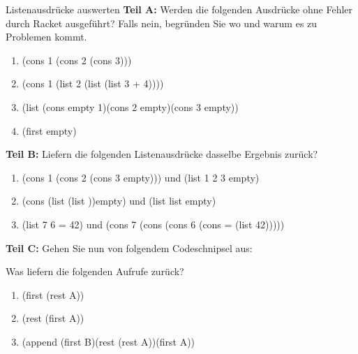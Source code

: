 \documentclass{../preamble}
\begin{document}
	\begin{task}[credit = \stars{1}{3}]{Listenausdrücke auswerten}
	    {\large\textbf{Teil A:}} Werden die folgenden Ausdrücke ohne Fehler durch Racket ausgeführt? Falls nein, begründen Sie wo und warum es zu Problemen kommt.
	    \begin{enumerate}
	        \item (\textcolor{keywordcolor}{cons} 1 (\textcolor{keywordcolor}{cons} 2 (\textcolor{keywordcolor}{cons} 3)))
	        \item (\textcolor{keywordcolor}{cons} 1 (\textcolor{keywordcolor}{list} 2 (\textcolor{keywordcolor}{list} (\textcolor{keywordcolor}{list} 3 + 4))))
	        \item (\textcolor{keywordcolor}{list} (\textcolor{keywordcolor}{cons} \textcolor{keywordcolor}{empty} 1)(\textcolor{keywordcolor}{cons} 2 \textcolor{keywordcolor}{empty})(\textcolor{keywordcolor}{cons} 3 \textcolor{keywordcolor}{empty}))
	        \item (\textcolor{keywordcolor}{first} \textcolor{keywordcolor}{empty})
	    \end{enumerate}
	    {\large\textbf{Teil B:}} Liefern die folgenden Listenausdrücke dasselbe Ergebnis zurück?
	    \begin{enumerate}
	        \item (\textcolor{keywordcolor}{cons} 1 (\textcolor{keywordcolor}{cons} 2 (\textcolor{keywordcolor}{cons} 3 \textcolor{keywordcolor}{empty}))) und (\textcolor{keywordcolor}{list} 1 2 3 \textcolor{keywordcolor}{empty})
	        \item (\textcolor{keywordcolor}{cons} (\textcolor{keywordcolor}{list} \grqq(\textcolor{keywordcolor}{list} )\grqq)\textcolor{keywordcolor}{empty}) und (\textcolor{keywordcolor}{list} \grqq\textcolor{keywordcolor}{list}\grqq{} \textcolor{keywordcolor}{empty})
	        \item (\textcolor{keywordcolor}{list} 7 \grqq *\grqq{} 6 \grqq =\grqq{} 42) und (\textcolor{keywordcolor}{cons} 7 (\textcolor{keywordcolor}{cons} \grqq *\grqq{} (\textcolor{keywordcolor}{cons} 6 (\textcolor{keywordcolor}{cons} \grqq =\grqq{} (\textcolor{keywordcolor}{list} 42)))))
	    \end{enumerate}
	    {\large\textbf{Teil C:}} Gehen Sie nun von folgendem Codeschnipsel aus:
	    
	    Was liefern die folgenden Aufrufe zurück?
	    \begin{enumerate}
	        \item (\textcolor{keywordcolor}{first} (\textcolor{keywordcolor}{rest} A))
	        \item (\textcolor{keywordcolor}{rest} (\textcolor{keywordcolor}{first} A))
	        \item (\textcolor{keywordcolor}{append} (\textcolor{keywordcolor}{first} B)(\textcolor{keywordcolor}{rest} (\textcolor{keywordcolor}{rest} A))(\textcolor{keywordcolor}{first} A))
	    \end{enumerate}
	

\end{task}
\end{document}
